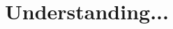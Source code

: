 \renewcommand*{\thefootnote}{\fnsymbol{footnote}}
\chapter[hello chapter 1]{Understanding...}
\label{Chapter3}

\renewcommand*{\thefootnote}{\arabic{footnote}}





